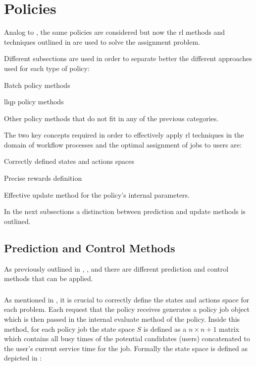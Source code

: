 \section{ Policies}
\label{sec:rl_policies}

Analog to , the same policies are considered but now the \gls{rl} methods and techniques outlined in  are used to solve the assignment problem.

Different subsections are used in order to separate better the different approaches used for each type of policy:
\begin{enumerate*}
	\item Batch policy methods
	\item \gls{llqp} policy methods
	\item Other policy methods that do not fit in any of the previous categories.
\end{enumerate*}

The two key concepts required in order to effectively apply \gls{rl} techniques in the domain of workflow processes and the optimal assignment of jobs to users are:
\begin{enumerate*}
	\item Correctly defined states and actions spaces
	\item Precise rewards definition
	\item Effective update method for the policy's internal parameters. 
\end{enumerate*}

In the next subsections a distinction between prediction and update methods is outlined.

\subsection{Prediction and Control Methods}

As previously outlined in , ,  and  there are different prediction and control methods that can be applied.

\subsubsection{}

As mentioned in , it is crucial to correctly define the states and actions space for each problem. Each request that the policy receives generates a policy job object which is then passed in the internal evaluate method of the policy. Inside this method, for each policy job the state space $S$ is defined as a $n \times n+1$ matrix which contains all busy times of the potential candidates (\ie users) concatenated to the user's current service time for the job. Formally the state space is defined as depicted in :

